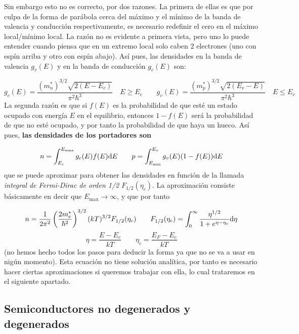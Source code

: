 Sin embargo esto no es correcto, por dos razones. La primera de ellas es que por culpa de la forma de parábola cerca del máximo y el mínimo de la banda de valencia y conducción respectivamente, es necesario redefinir el cero en el máximo local/mínimo local. La razón no es evidente a primera vista, pero uno lo puede entender cuando piensa que en un extremo local solo caben 2 electrones (uno con espín arriba y otro con espín abajo). Así pues, las densidades en la banda de valencia $g_v(E)$ y en la banda de conducción $g_c(E)$ son:

\begin{equation}
	g_c(E) = \frac{(m_n^*)^{3/2} \sqrt{2(E-E_c)}}{\pi^2 \hbar^3} \quad E \geq E_c \qquad 	g_v(E) = \frac{(m_p^*)^{3/2} \sqrt{2(E_v-E)}}{\pi^2 \hbar^3} \quad E \leq E_v
\end{equation}
La segunda razón es que si $f(E)$ es la probabilidad de que esté un estado ocupado con energía $E$ en el equilibrio, entonces $1-f(E)$ será la probabilidad de que no esté ocupado, y por tanto la probabilidad de que haya un hueco. Así pues, \textbf{las densidades de los portadores son}

\begin{equation}
	n=\int_{E_c}^{E_{\max}} g_c(E)f(E)\mathrm{d} E \qquad p = \int_{E_{\min}}^{E_v} g_v(E) (1-f(E))\mathrm{d} E
\end{equation}
que se puede aproximar para obtener las densidades en función de la llamada \textit{integral de Fermi-Dirac de orden 1/2} $F_{1/2}(\eta_c)$. La aproximación consiste básicamente en decir que $E_{\max} \rightarrow \infty$, y que por tanto

\begin{equation}
	n = \frac{1}{2\pi^2} \left( \frac{2m_e^*}{\hbar^2} \right)^{3/2} (kT)^{3/2} F_{1/2}(\eta_c) \qquad F_{1/2}(\eta_c) = \int_0^\infty \frac{\eta^{1/2}}{1+e^{\eta-\eta_c}}\mathrm{d} \eta 	
\end{equation}
\begin{equation}
	\eta=\frac{E-E_c}{kT} \qquad \eta_c= \frac{E_F-E_c}{kT}
\end{equation}
(no hemos hecho todos los pasos para deducir la forma ya que no se va a usar en nigún momento).
Esta ecuación no tiene solución analítica, por tanto es necesario hacer ciertas aproximaciones si queremos trabajar con ella, lo cual trataremos en el siguiente apartado. 

\subsection{Semiconductores no degenerados y degenerados}

